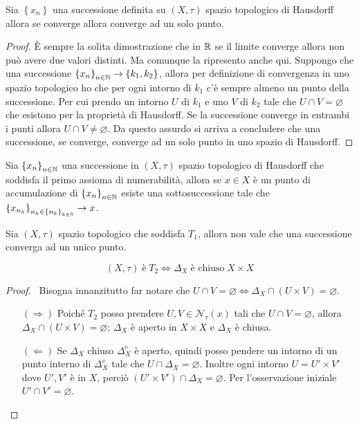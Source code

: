 \begin{theorem}
	Sia $\left\{x_n\right\}$ una successione definita su $(X, \tau)$ spazio topologico di Hausdorff allora se converge allora converge ad un solo punto. 
\end{theorem} 
\begin{proof}
	È sempre la solita dimostrazione che in $\mathbb{R}$ se il limite converge allora non può avere due valori distinti. Ma comunque la ripresento anche qui. Suppongo che una successione $\left\{x_n\right\}_{n \in \mathbb{N}} \rightarrow \left\{k_1, k_2\right\}$, allora per definizione di convergenza in uno spazio topologico ho che per ogni intorno di $k_1$ c'è sempre almeno un punto della successione. Per cui prendo un intorno $U$ di $k_1$ e uno $V$ di $k_2$ tale che $U \cap V = \varnothing$ che esistono per la proprietà di Hausdorff. Se la successione converge in entrambi i punti allora $U \cap V \neq \varnothing$. Da questo assurdo si arriva a concludere che una successione, se converge, converge ad un solo punto in uno spazio di Hausdorff. 
\end{proof}

\begin{theorem}
	Sia $\left\{x_n\right\}_{n\in \mathbb{N}}$ una successione in $(X,\tau)$ spazio topologico di Hausdorff che soddisfa il primo assioma di numerabilità, allora se $x \in X$ è un punto di accumulazione di $\left\{x_n\right\}_{n\in \mathbb{N}}$ esiste una sottosuccessione tale che $\left\{x_{n_k}\right\}_{n_k \in \left\{n_k\right\}_{k \in \mathbb{N}}} \rightarrow x$. 
\end{theorem}

\begin{remark}
	Sia $(X, \tau)$ spazio topologico che soddisfa $T_1$, allora non vale che una successione converga ad un unico punto.
\end{remark}

\begin{theorem}
	\begin{equation*}
	(X, \tau) \; \text{è} \; T_2 \Leftrightarrow \Delta_{X} \; \text{è chiuso} \; X \times X
	\end{equation*}
\end{theorem} 
\begin{proof} \
	Bisogna innanzitutto far notare che $U \cap V = \varnothing \Leftrightarrow \Delta_X \cap (U \times V) = \varnothing$.
	\begin{enumerate}
		\item[$(\Rightarrow)$] Poiché $T_2$ posso prendere $U, V \in \mathcal{N}_\tau(x)$ tali che $U \cap V = \varnothing$, allora $\Delta_X \cap (U \times V) = \varnothing$; $\Delta_X$ è aperto in $X\times X$ e $\Delta_X$ è chiusa. 
		\item[$(\Leftarrow)$] Se $\Delta_X$ chiuso $\Delta^c_X$ è aperto, quindi posso pendere un intorno di un punto interno di $\Delta^c_X$ tale che $U \cap \Delta_X = \varnothing$. Inoltre ogni intorno $U = U' \times V'$ dove $U', V'$ è in $X$, perciò $(U' \times V') \cap \Delta_X = \varnothing$. Per l'osservazione iniziale $U' \cap V' = \varnothing$.
	\end{enumerate}
\end{proof}

